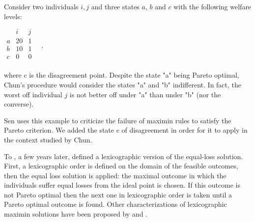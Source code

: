 \begin{example}\label{ex:sen}
	Consider two individuals $i,j$ and three states $a$, $b$ and $c$ with the following welfare levels:
	
	\begin{center}
		$
		\begin{array}{ccc}
			& i & j \\
			a &	20 & 1 \\
			b &	10 & 1 \\
			c & 0 & 0 \\
		\end{array} \quad, 
		$
	\end{center}
	where c is the disagreement point.
	Despite the state "a" being Pareto optimal, Chun's procedure would consider the states "a" and "b" indifferent. In fact, the worst off individual $j$ is not better off under "a" than under "b" (nor the converse).
\end{example}

Sen uses this example to criticize the failure of maximin rules to satisfy the Pareto criterion. We added the state c of disagreement in order for it to apply in the context studied by Chun.
 
To , a few years later, \citet{Chun1991} defined a lexicographic version of the equal-loss solution. 
First, a lexicographic order is defined on the domain of the feasible outcomes, then the equal loss solution is applied: the maximal outcome in which the individuals suffer equal losses from the ideal point is chosen. If this outcome is not Pareto optimal then the next one in lexicographic order is taken until a Pareto optimal outcome is found. Other characterizations of lexicographic maximin solutions have been proposed by \citet{Sen2017} and \citet{Chang1999}.

